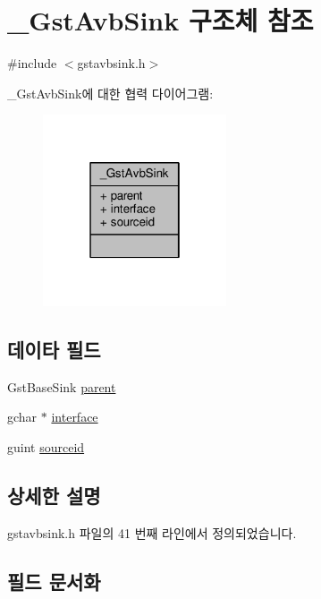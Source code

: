 \hypertarget{struct___gst_avb_sink}{}\section{\+\_\+\+Gst\+Avb\+Sink 구조체 참조}
\label{struct___gst_avb_sink}


{\ttfamily \#include $<$gstavbsink.\+h$>$}



\+\_\+\+Gst\+Avb\+Sink에 대한 협력 다이어그램\+:
\nopagebreak
\begin{figure}[H]
\begin{center}
\leavevmode
\includegraphics[width=154pt]{struct___gst_avb_sink__coll__graph}
\end{center}
\end{figure}
\subsection*{데이타 필드}
\begin{DoxyCompactItemize}
\item 
Gst\+Base\+Sink \hyperlink{struct___gst_avb_sink_a6759159a23c11964b2c7d2a27a8b121e}{parent}
\item 
gchar $\ast$ \hyperlink{struct___gst_avb_sink_a796aab0c0ba78c463684181ccbcac365}{interface}
\item 
guint \hyperlink{struct___gst_avb_sink_af1aa180762d2e3eab179a2ac3b90be79}{sourceid}
\end{DoxyCompactItemize}


\subsection{상세한 설명}


gstavbsink.\+h 파일의 41 번째 라인에서 정의되었습니다.



\subsection{필드 문서화}
